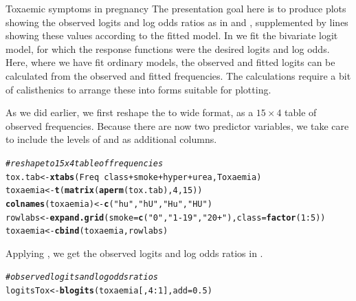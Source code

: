 \documentclass[11pt]{book}\usepackage[]{graphicx}\usepackage[]{color}
\makeatletter
\newcommand{\hlnum}[1]{\textcolor[rgb]{0.686,0.059,0.569}{#1}}%
\newcommand{\hlstr}[1]{\textcolor[rgb]{0.192,0.494,0.8}{#1}}%
\newcommand{\hlcom}[1]{\textcolor[rgb]{0.678,0.584,0.686}{\textit{#1}}}%
\newcommand{\hlopt}[1]{\textcolor[rgb]{0,0,0}{#1}}%
\newcommand{\hlstd}[1]{\textcolor[rgb]{0.345,0.345,0.345}{#1}}%
\newcommand{\hlkwb}[1]{\textcolor[rgb]{0.69,0.353,0.396}{#1}}%
\newcommand{\hlkwc}[1]{\textcolor[rgb]{0.333,0.667,0.333}{#1}}%
\newcommand{\hlkwd}[1]{\textcolor[rgb]{0.737,0.353,0.396}{\textbf{#1}}}%
\newenvironment{kframe}{%
 \def\at@end@of@kframe{}%
 \ifinner\ifhmode%
  \def\at@end@of@kframe{\end{minipage}}%
  \begin{minipage}{\columnwidth}%
 \fi\fi%
 \def\FrameCommand##1{\hskip\@totalleftmargin \hskip-\fboxsep
 \colorbox{shadecolor}{##1}\hskip-\fboxsep
     \hskip-\linewidth \hskip-\@totalleftmargin \hskip\columnwidth}%
 \MakeFramed {\advance\hsize-\width
   \@totalleftmargin\z@ \linewidth\hsize
   \@setminipage}}%
 {\par\unskip\endMakeFramed%
 \at@end@of@kframe}
\newenvironment{knitrout}{}{} %
\renewenvironment{knitrout}{\small\renewcommand{\baselinestretch}{.85}}{} %
\makeatother
\begin{document}
\begin{Example}[toxaemia]{Toxaemic symptoms in pregnancy}
The presentation goal here is to produce plots showing the
observed logits and log odds ratios as in  and ,
supplemented by lines showing these values according to the fitted model.
In  we fit the bivariate logit model, for which the
response functions were the desired logits and log odds.
Here, where we have fit ordinary \loglin models, the observed and
fitted logits can be calculated from the observed and fitted frequencies.
The calculations require a bit of \R calisthenics to arrange these
into forms suitable for plotting.

As we did earlier, we first reshape the  to wide format,
as a $15 \times 4$ table of observed frequencies.
Because there are now two predictor variables, we take care to
include the levels of  and  as additional columns.
\begin{knitrout}
\color{fgcolor}\begin{kframe}
\begin{alltt}
\hlcom{# reshape to 15 x 4 table of frequencies}
\hlstd{tox.tab} \hlkwb{<-} \hlkwd{xtabs}\hlstd{(Freq}\hlopt{~}\hlstd{class} \hlopt{+} \hlstd{smoke} \hlopt{+} \hlstd{hyper} \hlopt{+} \hlstd{urea, Toxaemia)}
\hlstd{toxaemia} \hlkwb{<-} \hlkwd{t}\hlstd{(}\hlkwd{matrix}\hlstd{(}\hlkwd{aperm}\hlstd{(tox.tab),} \hlnum{4}\hlstd{,} \hlnum{15}\hlstd{))}
\hlkwd{colnames}\hlstd{(toxaemia)} \hlkwb{<-} \hlkwd{c}\hlstd{(}\hlstr{"hu"}\hlstd{,} \hlstr{"hU"}\hlstd{,} \hlstr{"Hu"}\hlstd{,} \hlstr{"HU"}\hlstd{)}
\hlstd{rowlabs} \hlkwb{<-} \hlkwd{expand.grid}\hlstd{(}\hlkwc{smoke}\hlstd{=}\hlkwd{c}\hlstd{(}\hlstr{"0"}\hlstd{,} \hlstr{"1-19"}\hlstd{,} \hlstr{"20+"}\hlstd{),} \hlkwc{class}\hlstd{=}\hlkwd{factor}\hlstd{(}\hlnum{1}\hlopt{:}\hlnum{5}\hlstd{))}
\hlstd{toxaemia} \hlkwb{<-} \hlkwd{cbind}\hlstd{(toxaemia, rowlabs)}
\end{alltt}
\end{kframe}
\end{knitrout}
Applying , we get the observed logits and log odds ratios
in .
\begin{knitrout}
\color{fgcolor}\begin{kframe}
\begin{alltt}
\hlcom{# observed logits and log odds ratios}
\hlstd{logitsTox} \hlkwb{<-} \hlkwd{blogits}\hlstd{(toxaemia[,}\hlnum{4}\hlopt{:}\hlnum{1}\hlstd{],} \hlkwc{add}\hlstd{=}\hlnum{0.5}\hlstd{)}

\end{alltt}
\end{kframe}
\end{knitrout}
\end{Example}
\end{document}

